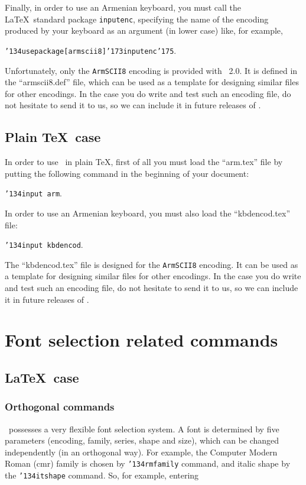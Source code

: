 \documentclass[12pt,a4paper,draft]{article}
\def\mybs{\char'134}
\def\mylbrace{\char'173}
\def\myrbrace{\char'175}
\def\myindent{\leavevmode}
\begin{document}
Finally, in order to use an Armenian keyboard, you must call the
\LaTeX\ standard package {\tt inputenc}, specifying the name of the encoding
produced by your keyboard as an argument (in lower case) like, for example,

{\tt \mybs usepackage[armscii8]\mylbrace inputenc\myrbrace}\qquad.

Unfortunately, only the {\tt ArmSCII8} encoding is provided with
\latArmTeX~2.0. It is defined in the ``armscii8.def'' file, which can be used
as a template for designing similar files for other encodings. In the case you
do write and test such an encoding file, do not hesitate to send it to us, so
we can include it in future releases of \latArmTeX.


\subsection{Plain \TeX\ case}

\myindent In order to use \latArmTeX\ in plain \TeX, first of all you must
load the ``arm.tex'' file by putting the following command in the beginning of
your document:

{\tt \mybs input arm}\qquad.

In order to use an Armenian keyboard, you must also load the ``kbdencod.tex''
file:

{\tt \mybs input kbdencod}\qquad.

The ``kbdencod.tex'' file is designed for the {\tt ArmSCII8} encoding. It can
be used as a template for designing similar files for other encodings. In the
case you do write and test such an encoding file, do not hesitate to send it
to us, so we can include it in future releases of \latArmTeX.


\section{Font selection related commands}
\subsection{\LaTeX\ case}
\label{lfonts}

\subsubsection{Orthogonal commands}

\myindent \LaTeXe\ possesses a very flexible font selection system. A font is
determined by five parameters (encoding, family, series, shape and size),
which can be changed independently (in an orthogonal way). For example, the
Computer Modern Roman (cmr) family is chosen by {\tt \mybs rmfamily} command,
and italic shape by the {\tt \mybs itshape} command. So, for example, entering
\end{document}
